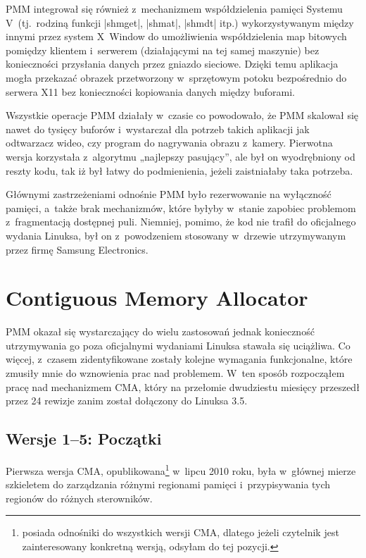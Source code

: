 PMM integrował się również z~mechanizmem współdzielenia pamięci
Systemu V~(tj.\ rodziną funkcji \code|shmget|, \code|shmat|,
\code|shmdt| itp.) wykorzystywanym między innymi przez system X~Window
do umożliwienia współdzielenia map bitowych pomiędzy klientem
i~serwerem (działającymi na tej samej maszynie) bez konieczności
przysłania danych przez gniazdo sieciowe.  Dzięki temu aplikacja mogła
przekazać obrazek przetworzony w~sprzętowym potoku bezpośrednio do
serwera X11 bez konieczności kopiowania danych między buforami.

Wszystkie operacje PMM działały w~czasie  co powodowało,
że PMM skalował się nawet do tysięcy buforów i~wystarczał dla potrzeb
takich aplikacji jak odtwarzacz wideo, czy program do nagrywania
obrazu z~kamery.  Pierwotna wersja korzystała z~algorytmu „najlepszy
pasujący”, ale był on wyodrębniony od reszty kodu, tak iż był łatwy do
podmienienia, jeżeli zaistniałaby taka potrzeba.

Głównymi zastrzeżeniami odnośnie PMM było rezerwowanie na wyłączność
pamięci, a~także brak mechanizmów, które byłyby w~stanie zapobiec
problemom z~fragmentacją dostępnej puli.  Niemniej, pomimo, że kod nie
trafił do oficjalnego wydania Linuksa, był on z~powodzeniem stosowany
w~drzewie utrzymywanym przez firmę Samsung Electronics.


\section{Contiguous Memory Allocator}

PMM okazał się wystarczający do wielu zastosowań jednak konieczność
utrzymywania go poza oficjalnymi wydaniami Linuksa stawała się
uciążliwa.  Co więcej, z~czasem zidentyfikowane zostały kolejne
wymagania funkcjonalne, które zmusiły mnie do wznowienia prac nad
problemem.  W~ten sposób rozpocząłem pracę nad mechanizmem CMA, który
na przełomie dwudziestu miesięcy przeszedł przez 24 rewizje zanim
został dołączony do Linuksa 3.5.

\subsection{Wersje 1--5: Początki}\label{sec:evo-cma}

Pierwsza wersja CMA, opublikowana\footnote{\autocite{patch:cma-24}
  posiada odnośniki do wszystkich wersji CMA, dlatego jeżeli czytelnik
  jest zainteresowany konkretną wersją, odsyłam do tej pozycji.}
w~lipcu 2010 roku, była w~głównej mierze szkieletem do zarządzania
różnymi regionami pamięci i~przypisywania tych regionów do różnych
sterowników.

